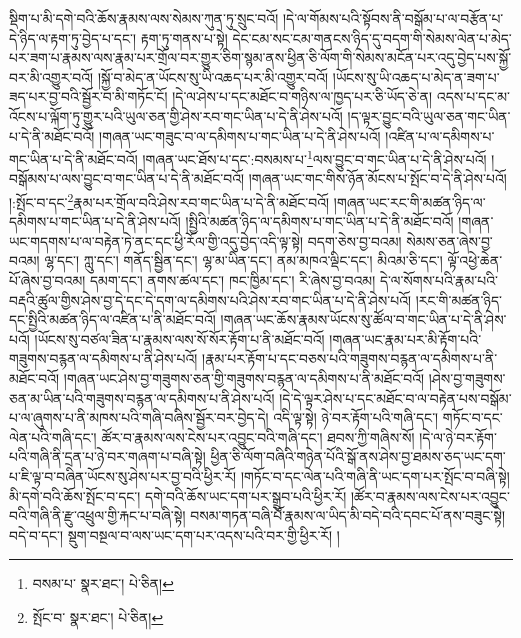སྡིག་པ་མི་དགེ་བའི་ཆོས་རྣམས་ལས་སེམས་ཀུན་ཏུ་སྲུང་བའོ། །དེ་ལ་གོམས་པའི་སྟོབས་ནི་བསྒོམ་པ་ལ་བརྩོན་པ་དེ་ཉིད་ལ་རྟག་ཏུ་བྱེད་པ་དང་། རྟག་ཏུ་གནས་པ་སྟེ། དེང་ངམ་སང་ངམ་གནངས་ཉིད་དུ་བདག་གི་སེམས་ལེན་པ་མེད་པར་ཟག་པ་རྣམས་ལས་རྣམ་པར་གྲོལ་བར་གྱུར་ཅིག་སྙམ་ནས་ཕྱིན་ཅི་ལོག་གི་སེམས་མངོན་པར་འདུ་བྱེད་པས་སྐྱོ་བར་མི་འགྱུར་བའོ། །སྐྱོ་བ་མེད་ན་ཡོངས་སུ་ཡི་འཆད་པར་མི་འགྱུར་བའོ། །ཡོངས་སུ་ཡི་འཆད་པ་མེད་ན་ཟག་པ་ཟད་པར་བྱ་བའི་སྦྱོར་བ་མི་གཏོང་ངོ། །དེ་ལ་ཤེས་པ་དང་མཐོང་བ་གཉིས་ལ་ཁྱད་པར་ཅི་ཡོད་ཅེ་ན། འདས་པ་དང་མ་འོངས་པ་ལྐོག་ཏུ་གྱུར་པའི་ཡུལ་ཅན་གྱི་ཤེས་རབ་གང་ཡིན་པ་དེ་ནི་ཤེས་པའོ། །ད་ལྟར་བྱུང་བའི་ཡུལ་ཅན་གང་ཡིན་པ་དེ་ནི་མཐོང་བའོ། །གཞན་ཡང་གཟུང་བ་ལ་དམིགས་པ་གང་ཡིན་པ་དེ་ནི་ཤེས་པའོ། །འཛིན་པ་ལ་དམིགས་པ་གང་ཡིན་པ་དེ་ནི་མཐོང་བའོ། །གཞན་ཡང་ཐོས་པ་དང་:བསམས་པ་\footnote{བསམ་པ་  སྣར་ཐང་།  པེ་ཅིན། }ལས་བྱུང་བ་གང་ཡིན་པ་དེ་ནི་ཤེས་པའོ། །བསྒོམས་པ་ལས་བྱུང་བ་གང་ཡིན་པ་དེ་ནི་མཐོང་བའོ། །གཞན་ཡང་གང་གིས་ཉོན་མོངས་པ་སྤོང་བ་དེ་ནི་ཤེས་པའོ། །:སྤོང་བ་དང་\footnote{སྤོང་བ་  སྣར་ཐང་།  པེ་ཅིན། }རྣམ་པར་གྲོལ་བའི་ཤེས་རབ་གང་ཡིན་པ་དེ་ནི་མཐོང་བའོ། །གཞན་ཡང་རང་གི་མཚན་ཉིད་ལ་དམིགས་པ་གང་ཡིན་པ་དེ་ནི་ཤེས་པའོ། །སྤྱིའི་མཚན་ཉིད་ལ་དམིགས་པ་གང་ཡིན་པ་དེ་ནི་མཐོང་བའོ། །གཞན་ཡང་གདགས་པ་ལ་བརྟེན་ཏེ་ནང་དང་ཕྱི་རོལ་གྱི་འདུ་བྱེད་འདི་ལྟ་སྟེ། བདག་ཅེས་བྱ་བའམ། སེམས་ཅན་ཞེས་བྱ་བའམ། ལྷ་དང་། ཀླུ་དང་། གནོད་སྦྱིན་དང་། ལྷ་མ་ཡིན་དང་། ནམ་མཁའ་ལྡིང་དང་། མིའམ་ཅི་དང་། ལྟོ་འཕྱེ་ཆེན་པོ་ཞེས་བྱ་བའམ། དམག་དང་། ནགས་ཚལ་དང་། ཁང་ཁྱིམ་དང་། རི་ཞེས་བྱ་བའམ། དེ་ལ་སོགས་པའི་རྣམ་པའི་བརྡའི་ཚུལ་གྱིས་ཤེས་བྱ་དེ་དང་དེ་དག་ལ་དམིགས་པའི་ཤེས་རབ་གང་ཡིན་པ་དེ་ནི་ཤེས་པའོ། །རང་གི་མཚན་ཉིད་དང་སྤྱིའི་མཚན་ཉིད་ལ་འཛིན་པ་ནི་མཐོང་བའོ། །གཞན་ཡང་ཆོས་རྣམས་ཡོངས་སུ་ཚོལ་བ་གང་ཡིན་པ་དེ་ནི་ཤེས་པའོ། །ཡོངས་སུ་བཙལ་ཟིན་པ་རྣམས་ལས་སོ་སོར་རྟོག་པ་ནི་མཐོང་བའོ། །གཞན་ཡང་རྣམ་པར་མི་རྟོག་པའི་གཟུགས་བརྙན་ལ་དམིགས་པ་ནི་ཤེས་པའོ། །རྣམ་པར་རྟོག་པ་དང་བཅས་པའི་གཟུགས་བརྙན་ལ་དམིགས་པ་ནི་མཐོང་བའོ། །གཞན་ཡང་ཤེས་བྱ་གཟུགས་ཅན་གྱི་གཟུགས་བརྙན་ལ་དམིགས་པ་ནི་མཐོང་བའོ། །ཤེས་བྱ་གཟུགས་ཅན་མ་ཡིན་པའི་གཟུགས་བརྙན་ལ་དམིགས་པ་ནི་ཤེས་པའོ། །དེ་དེ་ལྟར་ཤེས་པ་དང་མཐོང་བ་ལ་བརྟེན་པས་བསྒོམ་པ་ལ་ཞུགས་པ་ནི་མཁས་པའི་གཞི་བཞིས་སྦྱོར་བར་བྱེད་དེ། འདི་ལྟ་སྟེ། ཉེ་བར་རྟོག་པའི་གཞི་དང་། གཏོང་བ་དང་ལེན་པའི་གཞི་དང་། ཚོར་བ་རྣམས་ལས་ངེས་པར་འབྱུང་བའི་གཞི་དང་། ཐབས་ཀྱི་གཞིས་སོ། །དེ་ལ་ཉེ་བར་རྟོག་པའི་གཞི་ནི་དྲན་པ་ཉེ་བར་གཞག་པ་བཞི་སྟེ། ཕྱིན་ཅི་ལོག་བཞིའི་གཉེན་པོའི་སྒོ་ནས་ཤེས་བྱ་ཐམས་ཅད་ཡང་དག་པ་ཇི་ལྟ་བ་བཞིན་ཡོངས་སུ་ཤེས་པར་བྱ་བའི་ཕྱིར་རོ། །གཏོང་བ་དང་ལེན་པའི་གཞི་ནི་ཡང་དག་པར་སྤོང་བ་བཞི་སྟེ། མི་དགེ་བའི་ཆོས་སྤོང་བ་དང་། དགེ་བའི་ཆོས་ཡང་དག་པར་སྒྲུབ་པའི་ཕྱིར་རོ། །ཚོར་བ་རྣམས་ལས་ངེས་པར་འབྱུང་བའི་གཞི་ནི་རྫུ་འཕྲུལ་གྱི་རྐང་པ་བཞི་སྟེ། བསམ་གཏན་བཞི་པོ་རྣམས་ལ་ཡིད་མི་བདེ་བའི་དབང་པོ་ནས་བཟུང་སྟེ། བདེ་བ་དང་། སྡུག་བསྔལ་བ་ལས་ཡང་དག་པར་འདས་པའི་བར་གྱི་ཕྱིར་རོ། །
